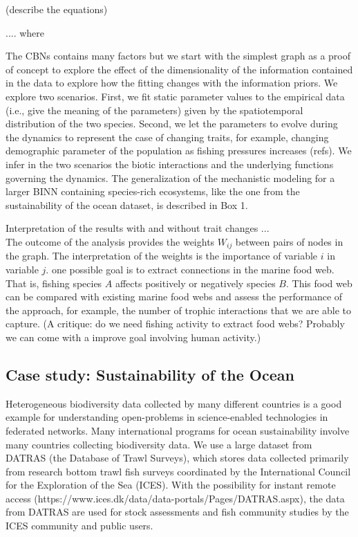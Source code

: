 \documentclass[12pt,a4paper]{article}
\begin{document}
(describe the equations)

.... where 

The CBNs contains many factors but we start with the simplest graph as a proof of concept to explore the effect of the dimensionality of the information contained in the data to explore how the fitting changes with the information priors. We explore two scenarios. First, we fit static parameter values to the empirical data (i.e., give the meaning of the parameters) given by the spatiotemporal distribution of the two species. Second, we let the parameters to evolve during the dynamics to represent the case of changing traits, for example, changing demographic parameter of the population as fishing pressures increases (refs). We infer in the two scenarios the biotic interactions and the underlying functions governing the dynamics. The generalization of the mechanistic modeling for a larger BINN containing species-rich ecosystems, like the one from the sustainability of the ocean dataset, is described in Box 1. 

Interpretation of the results with and without trait changes ...\\
The outcome of the analysis provides the weights $W_{ij}$ between pairs of nodes in the graph. The interpretation of the weights is the importance of variable $i$ in variable $j$. one possible goal is to extract connections in the marine food web. That is, fishing species $A$ affects positively or negatively species $B$. This food web can be compared with existing marine food webs and assess the performance of the approach, for example, the number of trophic interactions that we are able to capture. (A critique: do we need fishing activity to extract food webs? Probably we can come with a improve goal involving human activity.) 

\subsection{Case study: Sustainability of the Ocean}

Heterogeneous biodiversity data collected by many different countries is a good example for understanding open-problems in science-enabled technologies in federated networks. Many international programs for ocean sustainability involve many countries collecting biodiversity data. We use a large dataset from DATRAS (the Database of Trawl Surveys), which stores data collected primarily from research bottom trawl fish surveys coordinated by the International Council for the Exploration of the Sea (ICES). With the possibility for instant remote access (https://www.ices.dk/data/data-portals/Pages/DATRAS.aspx), the data from DATRAS are used for stock assessments and fish community studies by the ICES community and public users. 
\end{document}
